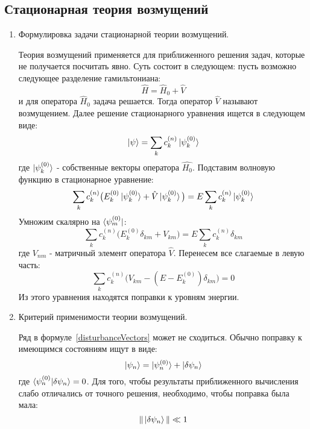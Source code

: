 \documentclass{article}
\begin{document}
\subsection*{Стационарная теория возмущений}
	\begin{enumerate}
		\item {Формулировка задачи стационарной теории возмущений.}
		
		Теория возмущений применяется для приближенного решения задач, которые не получается посчитать явно. Суть состоит в следующем: пусть возможно следующее разделение гамильтониана:
		\begin{equation}
			\hat{H} = \hat{H}_0 + \hat{V}
		\end{equation}
		и для оператора $\hat{H}_0$ задача решается. Тогда оператор $\hat{V}$ называют {возмущением}. Далее решение стационарного уравнения ищется в следующем виде:
		\begin{equation}
			\ket{\psi} = \sum\limits_{k} c_k^{(n)} \ket{\psi_k^{(0)}} \label{disturbanceVectors}
		\end{equation}
		где $\ket{\psi_k^{(0)}}$ - собственные векторы оператора $\hat{H_0}$. Подставим волновую функцию в стационарное уравнение:
		\begin{equation}
			\sum\limits_{k}c_k^{(n)}\big(E_k^{(0)} \ket{\psi_k^{(0)}} + \hat{V}\ket{\psi_k^{(0)}}\big) = E\sum\limits_{k}c_k^{(n)} \ket{\psi_k^{(0)}}
		\end{equation}
		Умножим скалярно на $\bra{\psi_m^{(0)}}$:
		\begin{equation}
			\sum\limits_{k}c_k^{(n)}\big(E_k^{(0)} \delta_{km} + V_{km}\big) = E\sum\limits_{k}c_k^{(n)}\delta_{km}
		\end{equation}
		где $V_{nm}$ - матричный элемент оператора $\hat{V}$. Перенесем все слагаемые в левую часть:
		\begin{equation}
			\sum\limits_{k}c_k^{(n)}\big(V_{km} - (E - E_k^{(0)} ) \delta_{km}\big) = 0
		\end{equation}
		Из этого уравнения находятся поправки к уровням энергии.
		
		\item {Критерий применимости теории возмущений.}
		
		Ряд в формуле~\eqref{disturbanceVectors} может не сходиться. Обычно поправку к имеющимся состояниям ищут в виде:
		\begin{equation}
			\ket{\psi_n} = \ket{\psi_n^{(0)}} + \ket{\delta \psi_n}
		\end{equation}
		где $\braket{\psi_n^{(0)}|\delta \psi_n} = 0$. Для того, чтобы результаты приближенного вычисления слабо отличались от точного решения, необходимо, чтобы поправка была мала:
		\begin{equation}
			\|\ket{\delta \psi_n}\| \ll 1
		\end{equation}
		

\end{enumerate}
\end{document}
